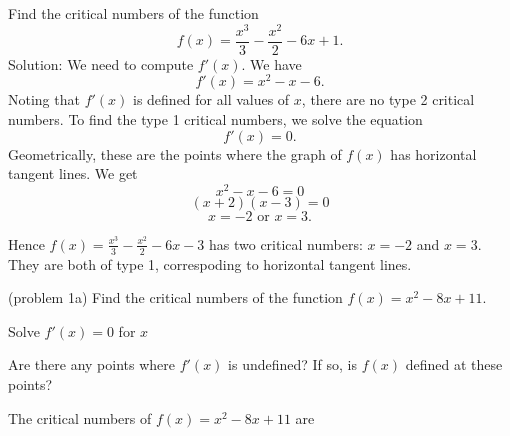 \documentclass{ximera}
\begin{document}
\begin{example}[example 1] Find the critical numbers of the function 
\[f(x) = \dfrac{x^3}{3} - \dfrac{x^2}{2} - 6x +1.\]
Solution: We need to compute $f'(x)$.  We have
\[f'(x) = x^2 - x - 6.\]
Noting that $f'(x)$ is defined for all values of $x$, there are no type 2 critical numbers.
To find the type 1 critical numbers, we solve the equation
\[f'(x) = 0.\]
Geometrically, these are the points where the graph of $f(x)$ has horizontal tangent lines.
We get
\[ x^2 - x - 6 =0\]
\[ (x+2)(x-3) =0\]
\[x = -2 \mbox{  or  } x = 3.\]

Hence $f(x) = \frac{x^3}{3} - \frac{x^2}{2} - 6x - 3$ has two critical numbers: $x=-2$ and $x=3$. They are both of type 1,
correspoding to horizontal tangent lines.

\begin{image}
\end{image}

\end{example}



\begin{problem}(problem 1a)
  Find the critical numbers of the function $f(x) = x^2 - 8x + 11$.
		\begin{hint}
      Solve $f'(x) = 0$ for $x$
    \end{hint}
    \begin{hint}
      Are there any points where $f'(x)$ is undefined?
      If so, is $f(x)$ defined at these points?  
		\end{hint}
    
    
		The critical numbers of $f(x) = x^2 - 8x + 11$ are
		\begin{multipleChoice}
		\end{multipleChoice}
		
\end{problem}
\end{document}
